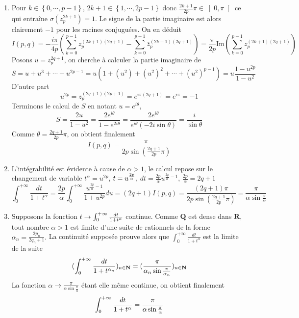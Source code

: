 \begin{enumerate}
\begin{enumerate}
\item  Pour $k\in \left\{ 0,\cdots ,p-1\right\} $, $2k+1\in \left\{ 1,\cdots
,2p-1\right\} $ donc $\frac{2k+1}{2p}\pi \in \left] 0,\pi \right[ $ ce qui
entra\^{i}ne $\sigma (z_{p}^{2k+1})=1$. Le signe de la partie imaginaire est
alors clairement $-1$ pour les racines conjugu\'{e}es. On en d\'{e}duit 
\[
I(p,q)=-\frac{i\pi }{4p}\left(
\sum_{k=0}^{p-1}z_{p}^{(2k+1)(2q+1)}-\sum_{k=0}^{p-1}\overline{z}%
_{p}^{(2k+1)(2q+1)}\right) =\frac{\pi }{2p}\mathrm{Im}\left(
\sum_{k=0}^{p-1}z_{p}^{(2k+1)(2q+1)}\right) 
\]
Posons $u=z_{p}^{2q+1}$, on cherche \`{a} calculer la partie imaginaire de 
\[
S=u+u^{3}+\cdots +u^{2p-1}=u\left( 1+(u^{2})+(u^{2})^{2}+\cdots
+(u^{2})^{p-1}\right) =u\frac{1-u^{2p}}{1-u^{2}} 
\]
D'autre part 
\[
u^{2p}=z_{p}^{(2q+1)(2p+1)}=e^{i\pi (2q+1)}=e^{i\pi }=-1 
\]
Terminons le calcul de $S$ en notant $u=e^{i\theta },$%
\[
S=\frac{2u}{1-u^{2}}=\frac{2e^{i\theta }}{1-e^{2i\theta }}=\frac{2e^{i\theta
}}{e^{i\theta }(-2i\sin \theta )}=\frac{i}{\sin \theta } 
\]
Comme $\theta =\frac{2q+1}{2p}\pi $, on obtient finalement 
\[
I(p,q)=\frac{\pi }{2p\sin (\frac{2q+1}{2p}\pi )} 
\]

\item  L'int\'{e}grabilit\'{e} est \'{e}vidente \`{a} cause de $\alpha >1$,
le calcul repose sur le changement de variable $t^{\alpha }=u^{2p}$, $t=u^{%
\frac{2p}{\alpha }}$, $dt=\frac{2p}{\alpha }u^{\frac{2p}{\alpha }-1}$, $%
\frac{2p}{\alpha }=2q+1$%
\[
\int_{0}^{+\infty }\frac{dt}{1+t^{\alpha }}=\frac{2p}{\alpha }%
\int_{0}^{+\infty }\frac{u^{\frac{2p}{\alpha }-1}}{1+u^{2p}}du=(2q+1)I(p,q)=%
\frac{(2q+1)\pi }{2p\sin (\frac{2q+1}{2p}\pi )}=\frac{\pi }{\alpha \sin 
\frac{\pi }{\alpha }} 
\]

\item  Supposons la fonction $t\rightarrow \int_{0}^{+\infty }\frac{dt}{%
1+t^{\alpha }}$ continue$.$ Comme $\mathbf{Q}$ est dense dans $\mathbf{R}$,
tout nombre $\alpha >1$ est limite d'une suite de rationnels de la forme $%
\alpha _{n}=\frac{2p_{n}}{2q_{n}+1}.$ La continuit\'{e} suppos\'{e}e prouve
alors que $\int_{0}^{+\infty }\frac{dt}{1+t^{\alpha }}$ est la limite de la
suite 
\[
(\int_{0}^{+\infty }\frac{dt}{1+t^{\alpha _{n}}})_{n\in \mathbf{N}}=(\frac{%
\pi }{\alpha _{n}\sin \frac{\pi }{\alpha _{n}}})_{n\in \mathbf{N}}
\]
La fonction $\alpha \rightarrow \frac{\pi }{\alpha \sin \frac{\pi }{\alpha }}
$ \'{e}tant elle m\^{e}me continue, on obtient finalement 
\[
\int_{0}^{+\infty }\frac{dt}{1+t^{\alpha }}=\frac{\pi }{\alpha \sin \frac{%
\pi }{\alpha }}
\]
\end{enumerate}
\end{enumerate}
